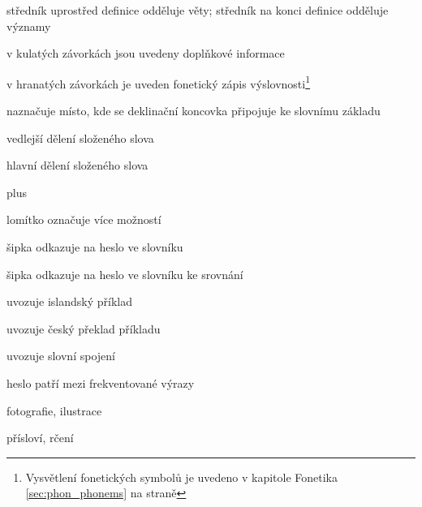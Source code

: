 \item[{;}] {středník uprostřed definice odděluje věty; středník na konci definice odděluje významy}

\item[{(...)}] {v kulatých závorkách jsou uvedeny doplňkové informace}
\item[{[...]}] {v hranatých závorkách je uveden fonetický zápis výslovnosti}\footnote{Vysvětlení fonetických symbolů je uvedeno v kapitole Fonetika \ref{sec:phon_phonems} na straně \pageref{sec:phon_phonems}}
\item[{|}] {naznačuje místo, kde se deklinační koncovka připojuje ke slovnímu základu}
\item[{·}] {vedlejší dělení složeného slova}
\item[{··}] {hlavní dělení složeného slova}
\item[{+}] {plus}
\item[{/}] {lomítko označuje více možností}
\item[{\dicsymSee}] {šipka odkazuje na heslo ve slovníku}
\item[{\dicsymCompare}] {šipka odkazuje na heslo ve slovníku ke srovnání}
\item[{\dicsymExampleIS}] {uvozuje islandský příklad}
\item[{\dicsymExampleCS}] {uvozuje český překlad příkladu}
\item[{\dicsymIdiom}] {uvozuje slovní spojení}
\item[{\dicsymFrequent}] {heslo patří mezi frekventované výrazy}

\item[{\dicsymPhoto}] {fotografie, ilustrace}
\item[{\dicsymProverb}] {přísloví, rčení}
